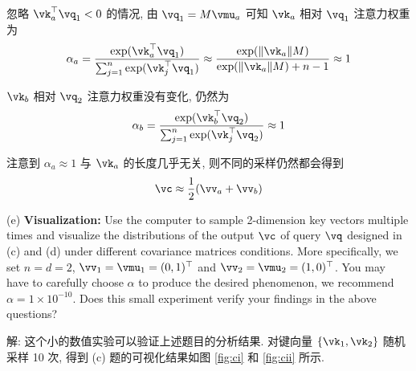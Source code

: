 \documentclass[openany]{ctexbook}
\theoremstyle{kaiti}
\theoremstyle{normal}
\begin{document}
忽略 $\vk_{a}^{\top}\vq_1<0$ 的情况, 由 $\vq_1=M\vmu_a$ 可知 $\vk_a$ 相对 $\vq_1$ 注意力权重为
\begin{equation}
  \alpha_a
  =\frac{\exp(\vk_{a}^{\top}\vq_1)}{\sum_{j=1}^{n}\exp(\vk_{j}^{\top}\vq_1)}
  \approx\frac{\exp(\|\vk_a\|M)}{\exp(\|\vk_a\|M)+n-1}
  \approx1
\end{equation}

$\vk_b$ 相对 $\vq_2$ 注意力权重没有变化, 仍然为
\begin{equation}
  \alpha_b
  =\frac{\exp(\vk_{b}^{\top}\vq_2)}{\sum_{j=1}^{n}\exp(\vk_{j}^{\top}\vq_2)}
  \approx1
\end{equation}

注意到 $\alpha_a\approx1$ 与 $\vk_a$ 的长度几乎无关, 则不同的采样仍然都会得到
\begin{equation}
  \vc\approx\frac{1}{2}(\vv_{a}+\vv_{b})
\end{equation}

(e) \textbf{Visualization:} Use the computer to sample 2-dimension key vectors multiple times and visualize the distributions of the output $\vc$ of query $\vq$ designed in (c) and (d) under different covariance matrices conditions. More specifically, we set $n = d = 2$, $\vv_1 = \vmu_{1} = (0, 1)^\top$ and $\vv_2 = \vmu_{2} = (1, 0)^\top$. You may have to carefully choose $\alpha$ to produce the desired phenomenon, we recommend $\alpha = 1\times10^{-10}$. Does this small experiment verify your findings in the above questions?

解: 这个小的数值实验可以验证上述题目的分析结果. 对键向量 $\{\vk_1,\vk_2\}$ 随机采样 10 次, 得到 (c) 题的可视化结果如图 \ref{fig:ci} 和 \ref{fig:cii} 所示.
\end{document}
